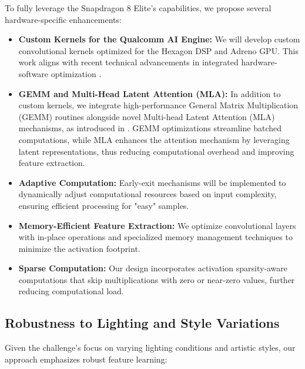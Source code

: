 \documentclass[11pt, oneside]{article}   	%
\begin{document}
To fully leverage the Snapdragon 8 Elite's capabilities, we propose several hardware-specific enhancements:

\begin{itemize}
	\item \textbf{Custom Kernels for the Qualcomm AI Engine:} We will develop custom convolutional kernels optimized for the Hexagon DSP and Adreno GPU. This work aligns with recent technical advancements in integrated hardware-software optimization \cite{deepseekai2025deepseekv3technicalreport}.

	\item \textbf{GEMM and Multi-Head Latent Attention (MLA):} In addition to custom kernels, we integrate high-performance General Matrix Multiplication (GEMM) routines alongside novel Multi-head Latent Attention (MLA) mechanisms, as introduced in \cite{deepseekai2025deepseekv3technicalreport}. GEMM optimizations streamline batched computations, while MLA enhances the attention mechanism by leveraging latent representations, thus reducing computational overhead and improving feature extraction.

	\item \textbf{Adaptive Computation:} Early-exit mechanisms will be implemented to dynamically adjust computational resources based on input complexity, ensuring efficient processing for "easy" samples.

	\item \textbf{Memory-Efficient Feature Extraction:} We optimize convolutional layers with in-place operations and specialized memory management techniques to minimize the activation footprint.

	\item \textbf{Sparse Computation:} Our design incorporates activation sparsity-aware computations that skip multiplications with zero or near-zero values, further reducing computational load.
\end{itemize}

\subsection*{Robustness to Lighting and Style Variations}

Given the challenge’s focus on varying lighting conditions and artistic styles, our approach emphasizes robust feature learning:
\end{document}

